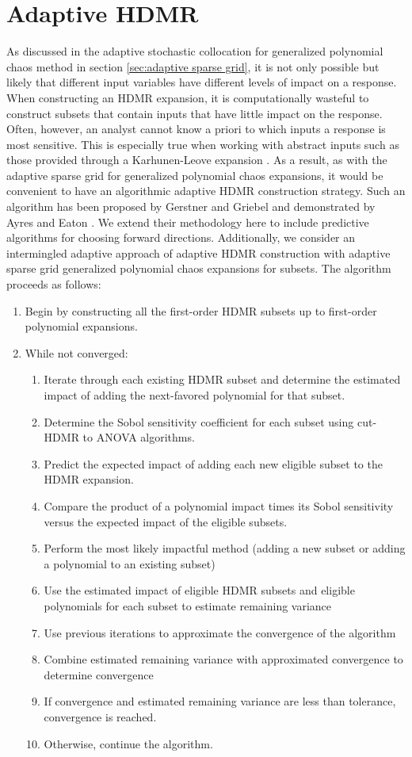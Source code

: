 \section{Adaptive HDMR}
As discussed in the adaptive stochastic collocation for generalized polynomial chaos method in section
\ref{sec:adaptive sparse grid}, it is not only possible but likely that different input variables have
different levels of impact on a response.  When constructing an HDMR expansion, it is computationally wasteful
to construct subsets that contain inputs that have little impact on the response.  Often, however, an analyst
cannot know a priori to which inputs a response is most sensitive.  This is especially true when working with
abstract inputs such as those provided through a Karhunen-Leove expansion \cite{karhunen}.  As a result, as
with the adaptive sparse grid for generalized polynomial chaos expansions, it would be convenient to have an
algorithmic adaptive HDMR construction strategy.  Such an algorithm has been proposed by Gerstner and Griebel
\cite{Gerstner} and demonstrated by Ayres and Eaton \cite{Ayres}.  We extend their methodology here to include
predictive algorithms for choosing forward directions.  Additionally, we consider an intermingled adaptive
approach of adaptive HDMR construction with adaptive sparse grid generalized polynomial chaos expansions for
subsets.  The algorithm proceeds as follows:
\begin{enumerate}
  \item Begin by constructing all the first-order HDMR subsets up to first-order polynomial expansions.
  \item While not converged:
    \begin{enumerate}
      \item Iterate through each existing HDMR subset and determine the estimated impact of adding the
        next-favored polynomial for that subset.
      \item Determine the Sobol sensitivity coefficient for each subset using cut-HDMR to ANOVA algorithms.
      \item Predict the expected impact of adding each new eligible subset to the HDMR expansion.
      \item Compare the product of a polynomial impact times its Sobol sensitivity versus the expected impact
        of the eligible subsets.
      \item Perform the most likely impactful method (adding a new subset or adding a polynomial to an
        existing subset)
      \item Use the estimated impact of eligible HDMR subsets and eligible polynomials for each subset to
        estimate remaining variance
      \item Use previous iterations to approximate the convergence of the algorithm
      \item Combine estimated remaining variance with approximated convergence to determine convergence
      \item If convergence and estimated remaining variance are less than tolerance, convergence is reached.
      \item Otherwise, continue the algorithm.
    \end{enumerate}
\end{enumerate}
